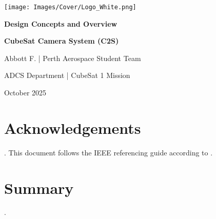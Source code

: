 \documentclass[10pt]{article}
\newcommand{\nl}{\newline \newline}
\begin{document}
\pagecolor[HTML]{0025A9}
\begin{titlepage}
    \centering
    \color{white}
    \vspace*{2cm}
    
    \texttt{[image: Images/Cover/Logo\_White.png]} %
    
    \vspace{2cm}
    {\LARGE\bfseries Design Concepts and Overview\par}
    \vspace{0.5cm}
    {\Huge\bfseries CubeSat Camera System (C2S)\par}
    
    \vspace{2cm}
    {\large Abbott F. \quad | \quad Perth Aerospace Student Team\par}
    \vspace{0.25cm}
    {\large ADCS Department \quad | \quad CubeSat 1 Mission\par}

    \vspace{3cm}
    \begin{abstract}
        This document presents all the considerations and processes towards developing the CubeSat Camera Systemm, an undergraduate student-based project as part of the Perth Aerospace Student Team.
        The project served as a strong platform to develop sophisticated understandings of various camera subsystems and succeed in refining skills of the Curtin Graduate Capabilities Matrix.
        \nl
        \textit{This document does not act as a formal publication under the Perth Aerospace Student Team.}
    \end{abstract}
    
    \vfill
    {\large October 2025\par}
\end{titlepage}

\pagecolor{white}
\color{black}
\pagestyle{fancy}
\section*{Acknowledgements}
.
This document follows the IEEE referencing guide according to \cite{ieee-ref-guide} \cite{writing-guide} \cite{ieee-editorial-guide}.

\newpage
\section*{Summary}
.
\newpage
\end{document}
